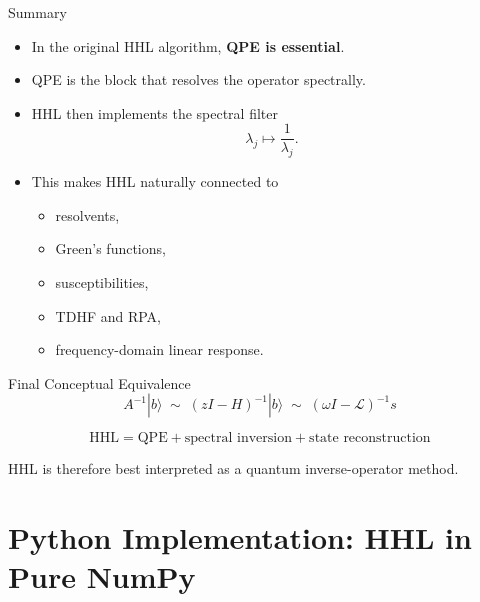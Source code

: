 \documentclass{beamer}
\begin{document}
\begin{frame}{Summary}
\begin{itemize}
\item In the original HHL algorithm, \textbf{QPE is essential}.
\item QPE is the block that resolves the operator spectrally.
\item HHL then implements the spectral filter
\[
\lambda_j \mapsto \frac{1}{\lambda_j}.
\]
\item This makes HHL naturally connected to
\begin{itemize}
\item resolvents,
\item Green's functions,
\item susceptibilities,
\item TDHF and RPA,
\item frequency-domain linear response.
\end{itemize}
\end{itemize}
\end{frame}


\begin{frame}{Final Conceptual Equivalence}
\[
\boxed{
A^{-1}|b\rangle
\;\sim\;
(zI-H)^{-1}|b\rangle
\;\sim\;
(\omega I-\mathcal{L})^{-1}s
}
\]

\vspace{0.4cm}
\[
\boxed{
\text{HHL}=
\text{QPE}
+
\text{spectral inversion}
+
\text{state reconstruction}
}
\]

HHL is therefore best interpreted as a quantum inverse-operator method.
\end{frame}


\section{Python Implementation: HHL in Pure NumPy}
\end{document}
